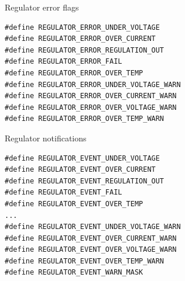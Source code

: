 \documentclass[10pt]{beamer}
\begin{document}
\begin{frame}[fragile]{Regulator error flags}
\begin{lstlisting}
#define REGULATOR_ERROR_UNDER_VOLTAGE
#define REGULATOR_ERROR_OVER_CURRENT
#define REGULATOR_ERROR_REGULATION_OUT
#define REGULATOR_ERROR_FAIL
#define REGULATOR_ERROR_OVER_TEMP
#define REGULATOR_ERROR_UNDER_VOLTAGE_WARN
#define REGULATOR_ERROR_OVER_CURRENT_WARN
#define REGULATOR_ERROR_OVER_VOLTAGE_WARN
#define REGULATOR_ERROR_OVER_TEMP_WARN
\end{lstlisting}
\end{frame}


\begin{frame}[fragile]{Regulator notifications}
\begin{lstlisting}
#define REGULATOR_EVENT_UNDER_VOLTAGE 
#define REGULATOR_EVENT_OVER_CURRENT  
#define REGULATOR_EVENT_REGULATION_OUT
#define REGULATOR_EVENT_FAIL
#define REGULATOR_EVENT_OVER_TEMP
...
#define REGULATOR_EVENT_UNDER_VOLTAGE_WARN
#define REGULATOR_EVENT_OVER_CURRENT_WARN
#define REGULATOR_EVENT_OVER_VOLTAGE_WARN
#define REGULATOR_EVENT_OVER_TEMP_WARN
#define REGULATOR_EVENT_WARN_MASK
\end{lstlisting}

\end{frame}

\end{document}
